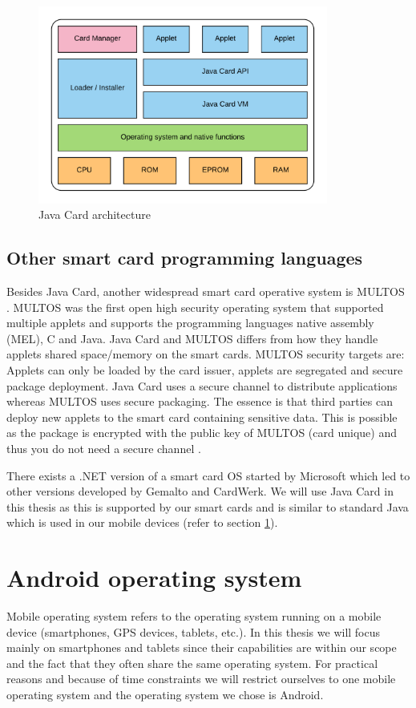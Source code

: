 \begin{figure}[h!]
  \caption{Java Card architecture}
  \label{fig:jca}
  \centering
    \includegraphics[width=0.85\textwidth]{images/javacardspecificArcitecture.png}
\end{figure}
\clearpage

\subsection{Other smart card programming languages}
Besides Java Card, another widespread smart card operative system is MULTOS \cite{multos}. MULTOS was the first open high security operating system that supported multiple applets and supports the programming languages native assembly (MEL), C and Java. Java Card and MULTOS differs from how they handle applets shared space/memory on the smart cards. MULTOS security targets are: Applets can only be loaded by the card issuer, applets are segregated and secure package deployment. Java Card uses a secure channel to distribute applications whereas MULTOS uses secure packaging. The essence is that third parties can deploy new applets to the smart card containing sensitive data. This is possible as the package is encrypted with the public key of MULTOS (card unique) and thus you do not need a secure channel \cite{smartcardThesis, multosVSjavacard}.

There exists a .NET version of a smart card OS started by Microsoft which led to other versions developed by Gemalto and CardWerk. We will use Java Card in this thesis as this is supported by our smart cards and is similar to standard Java which is used in our mobile devices (refer to section \ref{sec:androidOS}).

\section{Android operating system}
\label{sec:androidOS}
Mobile operating system refers to the operating system running on a mobile device (smartphones, GPS devices, tablets, etc.). In this thesis we will focus mainly on smartphones and tablets since their capabilities are within our scope and the fact that they often share the same operating system. For practical reasons and because of time constraints we will restrict ourselves to one mobile operating system and the operating system we chose is Android.

